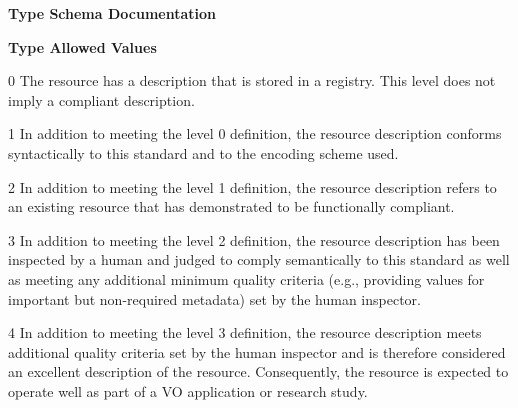 \documentclass[11pt,a4paper]{ivoa}
\begin{document}
\begin{generated}
\begingroup
      	\renewcommand*\descriptionlabel[1]{%
      	\hbox to 5.5em{\emph{#1}\hfil}}\vspace{2ex}\noindent\textbf{ Type Schema Documentation}



\vspace{2ex}\noindent\textbf{ Type Allowed Values}

\begin{longtermsdescription}\item[0]
              The resource has a description that is stored in a
              registry. This level does not imply a compliant
              description. 
            
\item[1]
              In addition to meeting the level 0 definition, the
              resource description conforms syntactically to this
              standard and to the encoding scheme used. 
            
\item[2]
              In addition to meeting the level 1 definition, the
              resource description refers to an existing resource that
              has demonstrated to be functionally compliant. 
            
\item[3]
              In addition to meeting the level 2 definition, the
              resource description has been inspected by a human and
              judged to comply semantically to this standard as well
              as meeting any additional minimum quality criteria (e.g.,
              providing values for important but non-required
              metadata) set by the human inspector.
            
\item[4]
              In addition to meeting the level 3 definition, the
              resource description meets additional quality criteria
              set by the human inspector and is therefore considered
              an excellent description of the resource. Consequently,
              the resource is expected to operate well as part of a
              VO application or research study.
            

\end{longtermsdescription}
\end{generated}
\end{document}
